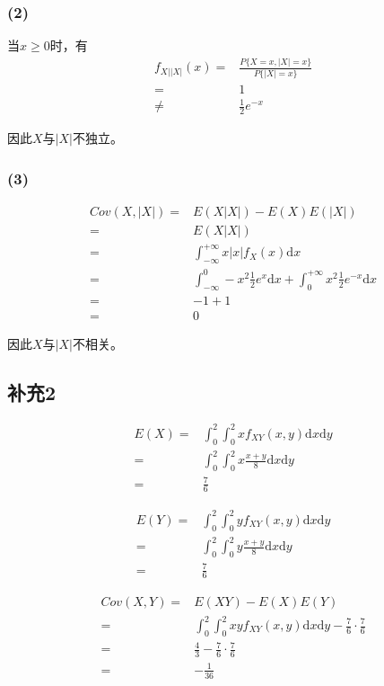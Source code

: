 \documentclass[a4paper,12pt]{ctexart}
\begin{document}
\subsubsection*{(2)}

当$x \geq 0$时，有
\begin{align*}
	f_{X \big| |X|}(x) =& \frac{P\{X = x, |X| = x\}}{P\{|X| = x\}} \\
				  =& 1 \\
				  \neq& \frac{1}{2} e^{-x}
\end{align*}

因此$X$与$|X|$不独立。

\subsubsection*{(3)}

\begin{align*}
	Cov(X,|X|) =& E(X|X|) - E(X)E(|X|) \\
			   =& E(X|X|) \\
			   =& \int_{-\infty}^{+\infty} x |x| f_X(x) \mathrm{d}x \\
			   =& \int_{-\infty}^{0} -x^2 \frac{1}{2} e^x \mathrm{d}x + \int_{0}^{+\infty} x^2 \frac{1}{2} e^{-x} \mathrm{d}x \\
			   =& -1 + 1 \\
			   =& 0
\end{align*}

因此$X$与$|X|$不相关。

\subsection*{补充2}

\begin{align*}
	E(X) =& \int_{0}^{2} \int_{0}^{2} x f_{XY}(x,y) \mathrm{d}x \mathrm{d}y \\
		 =& \int_{0}^{2} \int_{0}^{2} x \frac{x+y}{8} \mathrm{d}x \mathrm{d}y \\
		 =& \frac{7}{6}
\end{align*}

\begin{align*}
	E(Y) =& \int_{0}^{2} \int_{0}^{2} y f_{XY}(x,y) \mathrm{d}x \mathrm{d}y \\
		 =& \int_{0}^{2} \int_{0}^{2} y \frac{x+y}{8} \mathrm{d}x \mathrm{d}y \\
		 =& \frac{7}{6}
\end{align*}

\begin{align*}
	Cov(X,Y) =& E(XY) - E(X)E(Y) \\
			 =& \int_{0}^{2} \int_{0}^{2} xy f_{XY}(x,y) \mathrm{d}x \mathrm{d}y - \frac{7}{6} \cdot \frac{7}{6} \\
			 =& \frac{4}{3} - \frac{7}{6} \cdot \frac{7}{6} \\
			 =& - \frac{1}{36}
\end{align*}
\end{document}
